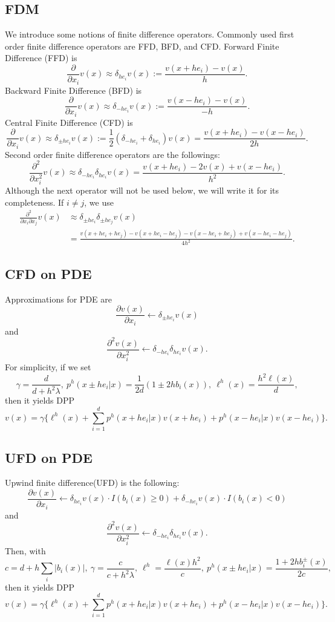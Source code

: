 \documentclass[11pt]{amsart}
\begin{document}
\subsection{FDM}
We introduce some notions of finite difference operators.
Commonly used first order finite difference operators 
are FFD, BFD, and CFD. 
Forward Finite Difference (FFD) is
$$\frac{\partial}{\partial x_{i}}v(x) \approx \delta_{he_{i}} v(x) 
:= \frac{v(x+he_{i}) - v(x)}{h}.$$
Backward Finite Difference (BFD) is
$$\frac{\partial}{\partial x_{i}}v(x) \approx \delta_{-he_{i}} v(x) 
:= \frac{v(x-he_{i}) - v(x)}{-h}.$$
Central Finite Difference (CFD) is
$$\frac{\partial}{\partial x_{i}}v(x) \approx 
\delta_{\pm h e_{i}} v(x)
:= \frac 1 2 (\delta_{-he_{i}} + \delta_{he_{i}}) v(x)
= \frac{v(x+he_{i}) - v(x-he_{i})}{2h}.$$
Second order finite difference operators are the followings:
$$
\frac{\partial^{2}}{\partial x_{i}^{2}} v(x)
\approx
\delta_{-he_{i}} \delta_{he_{i}} v(x)
= \frac{v(x+he_{i}) - 2 v(x) + v(x- he_{i})}{h^{2}}.
$$
Although the next operator will not be used below, we will write it for its completeness. If $i \neq j$, we use
$$
\begin{array}
 {ll}
\frac{\partial^{2}}{\partial x_{i} \partial x_{j}} v(x) &\approx
\delta_{\pm he_{i}} \delta_{\pm he_{j}} v(x)
\\ 
& \displaystyle
= \frac{v(x+he_{i}+he_{j}) - v(x+he_{i}-he_{j})
- v(x-he_{i}+he_{j})+ v(x-he_{i}-he_{j})}{4h^{2}}. 
\end{array}
$$


\subsection{CFD on PDE}
Approximations for PDE are 
$$
\frac{\partial v(x)}{\partial x_i} \leftarrow 
\delta_{\pm h e_{i}} v(x)
$$
and
$$
\frac{\partial^2 v(x)}{\partial x_i^2} \leftarrow
\delta_{-he_{i}} \delta_{he_{i}} v(x).$$
For simplicity, if we set 
$$
\gamma = \frac{d}{d+ h^{2} \lambda}, \
p^{h}(x \pm he_{i}|x) = \frac 1 {2d} (1 \pm 2h b_{i}(x)), \
\ell^{h}(x) = \frac{h^{2} \ell(x)}{d},
$$
then it yields DPP
$$
v (x) = \gamma 
\Big\{ \ell^{h}(x) + 
\sum_{i=1}^{d} 
p^{h}(x+he_{i}|x) v(x+he_{i})
+ p^{h}(x-he_{i}|x) v(x-he_{i})
\Big\}.
$$

\subsection{UFD on PDE}
Upwind finite difference(UFD) is the following:
$$
\frac{\partial v(x)}{\partial x_i} \leftarrow 
\delta_{ h e_{i}} v(x) \cdot I(b_{i}(x)\ge 0) +
\delta_{-he_{i}} v(x) \cdot I(b_{i}(x) <0)
$$
and
$$
\frac{\partial^2 v(x)}{\partial x_i^2} \leftarrow
\delta_{-he_{i}} \delta_{he_{i}} v(x).$$
Then, with
$$c = d+h\sum_{i} |b_{i}(x)|, \ 
\gamma = \frac{c}{c+h^{2}\lambda}, \ 
\ell^{h} = \frac{\ell(x) h^{2}}{c}, \ 
p^{h}(x \pm he_{i}|x) = \frac{1+ 2hb_{i}^{\pm}(x)}{2c},
$$
then it yields DPP
$$
v (x) = \gamma 
\Big\{ \ell^{h}(x) + 
\sum_{i=1}^{d} 
p^{h}(x+he_{i}|x) v(x+he_{i})
+ p^{h}(x-he_{i}|x) v(x-he_{i})
\Big\}.
$$
\end{document}
